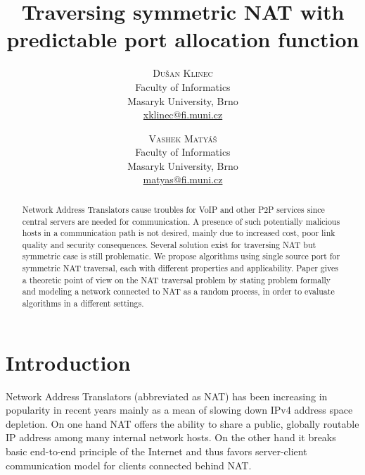 \documentclass{llncs}
\title{\vspace{-15mm}%
	\fontsize{24pt}{10pt}\selectfont
	\textbf{Traversing symmetric NAT with predictable port allocation function}
	}
\author{%
	\large
	\textsc{Du\v{s}an Klinec} \\[2mm]%
	\normalsize	Faculty of Informatics \\
	\normalsize	Masaryk University, Brno \\
	\normalsize	\href{mailto:xklinec@fi.muni.cz}{xklinec@fi.muni.cz}
	\and
	\textsc{Vashek Matyáš} \\[2mm]%
	\normalsize	Faculty of Informatics \\
	\normalsize	Masaryk University, Brno \\
	\normalsize	\href{mailto:matyas@fi.muni.cz}{matyas@fi.muni.cz}
	\vspace{-5mm}
	}
\date{}
\begin{document}
\maketitle

\begin{abstract}
\noindent Network Address Translators cause troubles for VoIP and other P2P services since central servers are needed for communication.
A presence of such potentially malicious hosts in a communication path is not desired, mainly due to increased cost, poor link quality 
and security consequences.
Several solution exist for traversing NAT but symmetric case is still problematic. We propose algorithms using single source port for 
symmetric NAT traversal, each with different properties and applicability. 
Paper gives a theoretic point of view on the NAT traversal problem by stating problem formally and modeling a network connected to 
NAT as a random process, in order to evaluate algorithms in a different settings.
% 
\end{abstract}
	


\section{Introduction}
Network Address Translators (abbreviated as NAT) has been increasing in popularity in recent years 
mainly as a mean of slowing down IPv4 address space depletion. On one hand NAT offers
the ability to share a public, globally routable IP address among many internal network hosts. On 
the other hand it breaks basic end-to-end principle of the Internet and thus favors server-client 
communication model for clients connected behind NAT.
\end{document}
